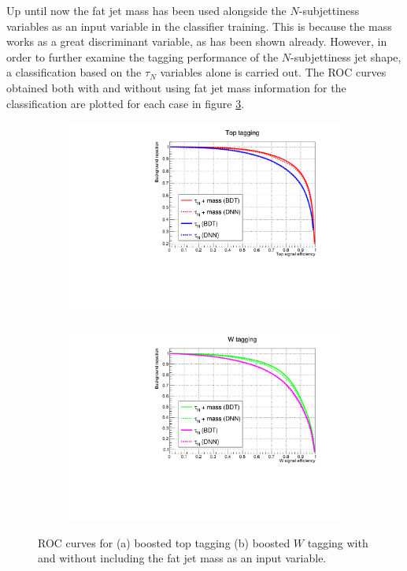 \documentclass[main]{subfiles} %
\begin{document}
Up until now the fat jet mass has been used alongside the $N$-subjettiness variables as an input variable in the classifier training. This is because the mass works as a great discriminant variable, as has been shown already. However, in order to further examine the tagging performance of the $N$-subjettiness jet shape, a classification based on the $\tau_N$ variables alone is carried out. The ROC curves obtained both with and without using fat jet mass information for the classification are plotted for each case in figure \ref{fig:ROC_mass_nomass}. \\

\begin{figure}[h]
     \centering
     \begin{subfigure}[h]{0.49\textwidth}
         \centering
         \includegraphics[width=\textwidth]{../Figures/Results/mass/top_mass_nomass.pdf}
          \caption{}
         \label{fig:top_mass_nomass}
     \end{subfigure}
     \begin{subfigure}[h]{0.49\textwidth}
         \centering
         \includegraphics[width=\textwidth]{../Figures/Results/mass/W_mass_nomass.pdf}
          \caption{}
         \label{fig:W_mass_nomass}
     \end{subfigure}
     \caption{ROC curves for (a) boosted top tagging (b) boosted $W$ tagging with and without including the fat jet mass as an input variable.}
     \label{fig:ROC_mass_nomass}
\end{figure}
\end{document}
